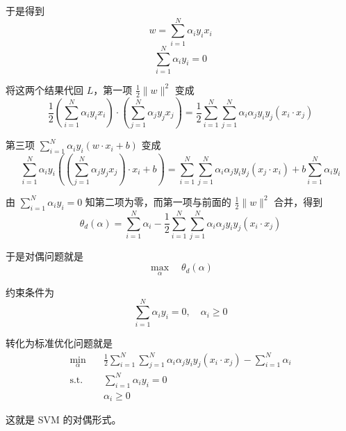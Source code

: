 于是得到
\begin{equation}
w = \sum_{i=1}^{N} \alpha_i y_i x_i
\end{equation}
\begin{equation}
\sum_{i=1}^{N} \alpha_i y_i = 0
\end{equation}

将这两个结果代回 $L$，第一项 $\frac{1}{2}\|w\|^2$ 变成
\begin{equation}
\frac{1}{2} \left( \sum_{i=1}^{N} \alpha_i y_i x_i \right) \cdot \left( \sum_{j=1}^{N} \alpha_j y_j x_j \right) = \frac{1}{2} \sum_{i=1}^{N} \sum_{j=1}^{N} \alpha_i \alpha_j y_i y_j (x_i \cdot x_j)
\end{equation}

第三项 $\sum_{i=1}^{N} \alpha_i y_i (w \cdot x_i + b)$ 变成
\begin{equation}
\sum_{i=1}^{N} \alpha_i y_i \left( \left( \sum_{j=1}^{N} \alpha_j y_j x_j \right) \cdot x_i + b \right) = \sum_{i=1}^{N} \sum_{j=1}^{N} \alpha_i \alpha_j y_i y_j (x_j \cdot x_i) + b \sum_{i=1}^{N} \alpha_i y_i
\end{equation}

由 $\sum_{i=1}^{N} \alpha_i y_i = 0$ 知第二项为零，而第一项与前面的 $\frac{1}{2}\|w\|^2$ 合并，得到
\begin{equation}
\theta_d(\alpha) = \sum_{i=1}^{N} \alpha_i - \frac{1}{2} \sum_{i=1}^{N} \sum_{j=1}^{N} \alpha_i \alpha_j y_i y_j (x_i \cdot x_j)
\end{equation}

于是对偶问题就是
\begin{equation}
\max_{\alpha} \quad \theta_d(\alpha)
\end{equation}

约束条件为
\begin{equation}
\sum_{i=1}^{N} \alpha_i y_i = 0, \quad \alpha_i \geq 0
\end{equation}

转化为标准优化问题就是
\begin{equation}
\boxed{
\begin{aligned}
\min_\alpha\quad & \frac{1}{2}\sum_{i=1}^{N}\sum_{j=1}^{N}
\alpha_i\alpha_j y_i y_j \left( x_i\cdot x_j\right) -\sum_{i=1}^{N} \alpha_i\\
\text{s.t.} \quad & \sum_{i=1}^{N} \alpha_i y_i =0  \\
& \alpha_i \geqslant 0
\end{aligned}}
\end{equation}

这就是 SVM 的对偶形式。